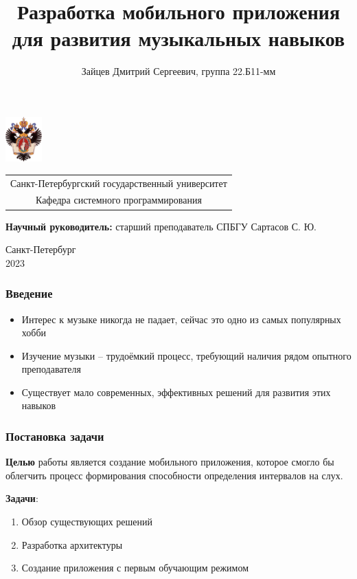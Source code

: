 \documentclass{beamer}
\title[Разработка приложения]{Разработка мобильного приложения для развития музыкальных навыков}
\institute[СПбГУ]{}
\author[Зайцев Дмитрий]{Зайцев Дмитрий Сергеевич, группа 22.Б11-мм}
\begin{document}
{
\begin{frame}
  \includegraphics[width=1.4cm]{pictures/SPbGU_Logo.png}
\vspace{-35pt}
\hspace{-10pt}
\begin{center}
   \begin{tabular}{c}
        \scriptsize{Санкт-Петербургский государственный университет} \\
        \scriptsize{Кафедра системного программирования}
    \end{tabular}
\titlepage
\end{center}

\btVFill

{\scriptsize
   \textbf{Научный руководитель:} старший преподаватель СПБГУ Сартасов С. Ю. \\
 }
\begin{center}
  \vspace{5pt}
  \scriptsize{Санкт-Петербург\\
                 2023}
  \end{center}

\end{frame}
}

\begin{frame}[fragile]  
  \frametitle{Введение}
  \begin{itemize}
    \item Интерес к музыке никогда не падает, сейчас это одно из самых популярных хобби
    \item Изучение музыки -- трудоёмкий процесс, требующий наличия рядом опытного преподавателя
    \item Существует мало современных, эффективных решений для развития этих навыков
  \end{itemize}
\end{frame}
           
\begin{frame}
  \frametitle{Постановка задачи}
  \textbf{Целью} работы является создание мобильного приложения, которое смогло бы облегчить
процесс формирования способности определения интервалов на слух.

  \textbf{Задачи}:
  \begin{enumerate}
    \item Обзор существующих решений
    \item Разработка архитектуры
    \item Создание приложения с первым обучающим режимом
  \end{enumerate}
\end{frame}                      
            
\end{document}
